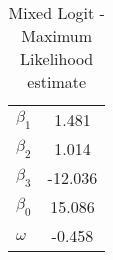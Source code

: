 \begin{table}[htb]
\centering
\caption{Mixed Logit - Maximum Likelihood estimate}\label{tab:mixed-mv}
\begin{tabular}{lc}
 \hline 
$\beta_1$ & 1.481 \\ 
$\beta_2$ & 1.014 \\ 
$\beta_3$ & -12.036 \\ 
$\beta_0$ & 15.086 \\ 
$\omega$ & -0.458 \\ 
\hline
\end{tabular}
\end{table}

